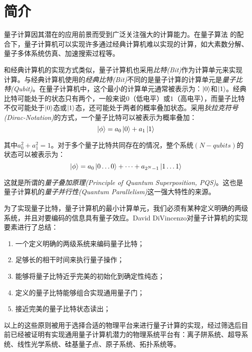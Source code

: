 
\chapter[简介]{简介\label{section:introduction}}

量子计算因其潜在的应用前景而受到广泛关注强大的计算能力。在量子算法
的配合下，量子计算机可以实现许多通过经典计算机难以实现的计算，如大素数分解\cite[]{Shor_1997, Singleton_Jr_2023}、量子多体系统仿真\cite[]{Feynman_1982, Lloyd_1996}、加速搜索过程\cite[]{Grover_2002}等。

和经典计算机的实现方式类似，量子计算机也采用\emph{比特(Bit)}作为计算单元来实现计算。与经典计算机使用的\emph{经典比特(Bit)}不同的是量子计算的计算单元是\emph{量子比特(Qubit)}。在量子计算机中，这个最小的计算单元通常被表示为：$\ket{0}$和$\ket{1}$。经典比特可能处于的状态只有两个，一般来说$0$（低电平）或$1$（高电平），而量子比特不仅可能处于$\ket{0}$态或$\ket{1}$态，还可能处于两者的概率叠加状态。采用\emph{狄拉克符号(Dirac-Notation)}的方式，一个量子比特可以被表示为概率叠加：$$\ket{\phi}=a_0\ket{0}+a_1\ket{1}$$

其中$a_0^2+a_1^2=1$。对于多个量子比特共同存在的情况，整个系统$(N-qubits)$的状态可以被表示为：$$\ket{\phi}=a_0\ket{0\dots0}+\dots+a_{2^N-1}\ket{1\dots1}$$

这就是所谓的\emph{量子叠加原理(Principle of Quantum Superposition, PQS)}\cite[]{Fedorov_Manko_2019}。这也是量子计算机的\emph{量子并行性(Quantum Parallelism)}这一强大特性的来源。

为了实现量子比特，量子计算机的最小计算单元，我们必须有某种定义明确的两级系统，并且对要编码的信息具有量子效应。David DiVincenzo对量子计算机的实现要素进行了总结\cite[]{DiVincenzo_2000}：
\begin{enumerate}
    \item 一个定义明确的两级系统来编码量子比特；
    \item 足够长的相干时间来执行量子操作；
    \item 能够将量子比特近乎完美的初始化到确定性纯态；
    \item 定义的量子比特能够组合实现通用量子门；
    \item 接近完美的量子比特状态读出；
\end{enumerate}

以上的这些原则被用于选择合适的物理平台来进行量子计算的实现，经过筛选后目前已经被证明有实现通用量子计算机潜力的物理系统平台有：离子阱系统、超导系统、线性光学系统、硅基量子点、原子系统、拓扑系统等。

